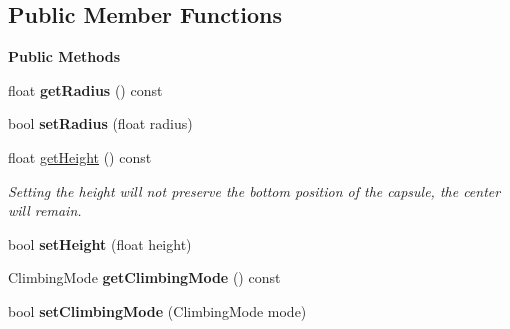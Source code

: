 \subsection*{Public Member Functions}
\begin{Indent}\textbf{ Public Methods}\par
\begin{DoxyCompactItemize}
\item 
\mbox{\label{classrev_1_1_capsule_controller_aefd6868f58be667cf804bc5275d4d261}} 
float {\bfseries get\+Radius} () const
\item 
\mbox{\label{classrev_1_1_capsule_controller_a72258167c3e00d5f05bbf835457f4cff}} 
bool {\bfseries set\+Radius} (float radius)
\item 
\mbox{\label{classrev_1_1_capsule_controller_aff5b7debec71d8d7fe2eb67d40dd6ea4}} 
float \mbox{\hyperlink{classrev_1_1_capsule_controller_aff5b7debec71d8d7fe2eb67d40dd6ea4}{get\+Height}} () const
\begin{DoxyCompactList}\small\item\em Setting the height will not preserve the bottom position of the capsule, the center will remain. \end{DoxyCompactList}\item 
\mbox{\label{classrev_1_1_capsule_controller_ad4d073e51d9530381838db9cbc9eb6dd}} 
bool {\bfseries set\+Height} (float height)
\item 
\mbox{\label{classrev_1_1_capsule_controller_a81baecaa81b779091b214378fd55084a}} 
Climbing\+Mode {\bfseries get\+Climbing\+Mode} () const
\item 
\mbox{\label{classrev_1_1_capsule_controller_a8c70c270e5ce0645dd315ef41ed75385}} 
bool {\bfseries set\+Climbing\+Mode} (Climbing\+Mode mode)
\end{DoxyCompactItemize}
\end{Indent}
